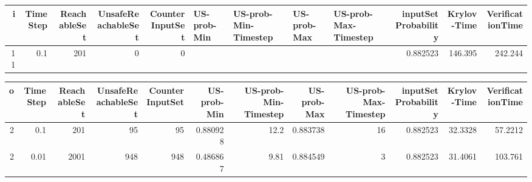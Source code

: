 \begin{tabular}{rrrrrllllrrr}
\hline
   i &   TimeStep &   ReachableSet &   UnsafeReachableSet &   CounterInputSet & US-prob-Min   & US-prob-Min-Timestep   & US-prob-Max   & US-prob-Max-Timestep   &   inputSet Probability &   Krylov-Time &   VerificationTime \\
\hline
  11 &        0.1 &            201 &                    0 &                 0 &               &                        &               &                        &               0.882523 &       146.395 &            242.244 \\
\hline
\end{tabular}
\begin{tabular}{rrrrrrrrrrrr}
\hline
   o &   TimeStep &   ReachableSet &   UnsafeReachableSet &   CounterInputSet &   US-prob-Min &   US-prob-Min-Timestep &   US-prob-Max &   US-prob-Max-Timestep &   inputSet Probability &   Krylov-Time &   VerificationTime \\
\hline
   2 &       0.1  &            201 &                   95 &                95 &      0.880928 &                  12.2  &      0.883738 &                     16 &               0.882523 &       32.3328 &            57.2212 \\
   2 &       0.01 &           2001 &                  948 &               948 &      0.486867 &                   9.81 &      0.884549 &                      3 &               0.882523 &       31.4061 &           103.761  \\
\hline
\end{tabular}
